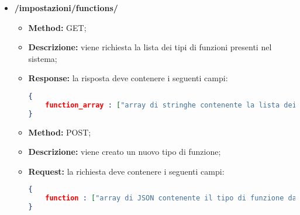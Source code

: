 \begin{itemize}
\begin{itemize}
\item \textbf{Method:} GET;
\item \textbf{Descrizione:} vengono richiesti dati relativi ad una specifica direttiva;
\item \textbf{Request:} la richiesta deve contenere i seguenti campi:
\begin{lstlisting}[language=json,firstnumber=1]
{
	id_rule : ["stringa contenente l'id della direttiva desiderata"]
}
\end{lstlisting}
\item \textbf{Response:} la risposta deve contenere i seguenti campi:
\begin{lstlisting}[language=json,firstnumber=1]
{
	rule : ["array di JSON contenente i dati associati alla direttiva desiderata"]
}
\end{lstlisting}
\end{itemize}

\begin{itemize}
\item \textbf{Method:} DELETE;
\item \textbf{Descrizione:} viene eliminata una direttiva;
\item \textbf{Request:} la richiesta deve contenere i seguenti campi:
\begin{lstlisting}[language=json,firstnumber=1]
{
	id_rule : ["stringa contenente l'id della direttiva da eliminare"]
}
\end{lstlisting}
\end{itemize}


\item \textbf{/impostazioni/functions/}\\

\begin{itemize}
\item \textbf{Method:} GET; 
\item \textbf{Descrizione:} viene richiesta la lista dei tipi di funzioni presenti nel sistema; 
\item \textbf{Response:} la risposta deve contenere i seguenti campi:
\begin{lstlisting}[language=json,firstnumber=1]
{
	function_array : ["array di stringhe contenente la lista dei tipi di funzioni presenti nel sistema"]
}
\end{lstlisting}
\end{itemize}

\begin{itemize}
\item \textbf{Method:} POST;
\item \textbf{Descrizione:} viene creato un nuovo tipo di funzione;
\item \textbf{Request:} la richiesta deve contenere i seguenti campi:
\begin{lstlisting}[language=json,firstnumber=1]
{
	function : ["array di JSON contenente il tipo di funzione da creare"]
}
\end{lstlisting}  
\end{itemize}




\end{itemize}

